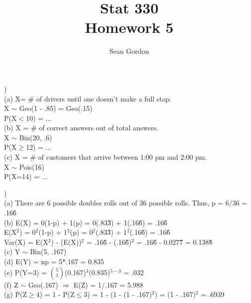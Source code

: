 \documentclass[12pt]{article}
\title{Stat 330\\Homework 5}
\author{Sean Gordon}
\begin{document}
\maketitle


\noindent\hrulefill 


)\\
\indent (a) X= \# of drivers until one doesn't make a full stop.\\
\indent \indent X $\sim$ Geo(1 - .85) = Geo(.15)\\
\indent \indent P(X$<$10) = ...\\

\indent (b) X = \# of correct answers out of total answers.\\
\indent \indent X $\sim$ Bin(20, .6)\\
\indent \indent P(X$\ge$12) = ...\\

\indent (c) X = \# of customers that arrive between 1:00 pm and 2:00 pm.\\
\indent \indent X $\sim$ Pois(16)\\
\indent \indent P(X=14) = ...\\[-.8em]


\noindent \hrulefill 

)\\
\indent (a) There are 6 possible doubles rolls out of 36 possible rolls. Thus, p = 6/36 = .16\~6\\

\indent (b) E(X) = 0(1-p) + 1(p) = 0(.83\~3) + 1(.16\~6) = .16\~6\\
\indent \indent E(X$^2$) = 0$^2$(1-p) + 1$^2$(p) = 0$^2$(.83\~3) + 1$^2$(.16\~6) = .16\~6\\
\indent \indent Var(X) = E(X$^2$) - (E(X))$^2$ = .16\~6 - (.16\~6)$^2$ = .16\~6 - 0.027\~7 = 0.138\~8\\

\indent (c) Y $\sim$ Bin(5, .167)\\

\indent (d) E(Y) = np = 5*.167 = 0.835\\

\indent (e) P(Y=3) = {\Large$\binom{5}{3}$}(0.167)$^{3}$(0.835)$^{5-3}$ = .032\\

\indent (f) Z $\sim$ Geo(.167) $\Rightarrow$ E(Z) = 1/.167 = 5.988\\

\indent (g) P(Z$\ge$4) = 1 - P(Z$\le$3) = 1 - (1 - (1 - .167)$^2$) = (1 - .167)$^2$ = .6939\\[-.8em]
\end{document}
